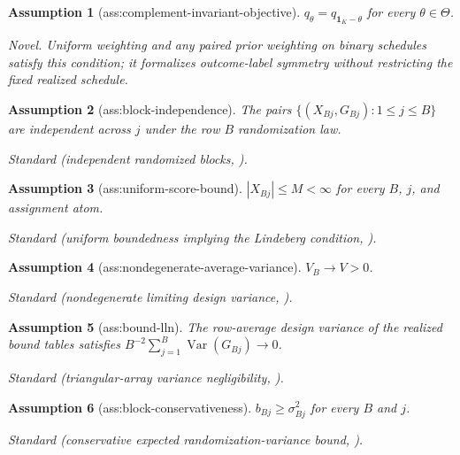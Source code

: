 \documentclass{article}
\newtheorem{assumption}{Assumption}
\begin{document}
\begin{assumption}[ass:complement-invariant-objective]\label{ass:complement-invariant-objective}
\(q_\theta=q_{\mathbf 1_K-\theta}\) for every \(\theta\in\Theta\).
\par\smallskip\noindent\emph{Novel.} Uniform weighting and any paired prior weighting on binary schedules satisfy this condition; it formalizes outcome-label symmetry without restricting the fixed realized schedule.
\end{assumption}

\begin{assumption}[ass:block-independence]\label{ass:block-independence}
The pairs \(\{(X_{Bj},G_{Bj}):1\le j\le B\}\) are independent across \(j\) under the row \(B\) randomization law.
\par\smallskip\noindent\emph{Standard} (independent randomized blocks, \cite{LiDing2017FPCLT}).
\end{assumption}

\begin{assumption}[ass:uniform-score-bound]\label{ass:uniform-score-bound}
\(|X_{Bj}|\le M<\infty\) for every \(B\), \(j\), and assignment atom.
\par\smallskip\noindent\emph{Standard} (uniform boundedness implying the Lindeberg condition, \cite{LiDing2017FPCLT}).
\end{assumption}

\begin{assumption}[ass:nondegenerate-average-variance]\label{ass:nondegenerate-average-variance}
\(V_B\to V>0\).
\par\smallskip\noindent\emph{Standard} (nondegenerate limiting design variance, \cite{LiDing2017FPCLT}).
\end{assumption}

\begin{assumption}[ass:bound-lln]\label{ass:bound-lln}
The row-average design variance of the realized bound tables satisfies \(B^{-2}\sum_{j=1}^B\operatorname{Var}(G_{Bj})\longrightarrow0\).
\par\smallskip\noindent\emph{Standard} (triangular-array variance negligibility, \cite{Billingsley1995ProbabilityMeasure}).
\end{assumption}

\begin{assumption}[ass:block-conservativeness]\label{ass:block-conservativeness}
\(b_{Bj}\ge\sigma_{Bj}^2\) for every \(B\) and \(j\).
\par\smallskip\noindent\emph{Standard} (conservative expected randomization-variance bound, \cite{HarshawMiddletonSavje2026}).
\end{assumption}
\end{document}
